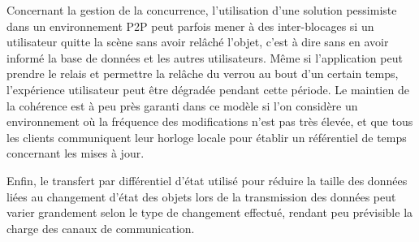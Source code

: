 Concernant la gestion de la concurrence, l'utilisation d'une solution pessimiste 
dans un environnement \gls{P2P} peut parfois mener à des inter-blocages si un 
utilisateur quitte la scène sans avoir relâché l'objet, c'est à dire sans en avoir 
informé la base de données et les autres 
utilisateurs. 
Même si l'application peut prendre le relais et permettre la relâche du 
verrou au bout d'un certain temps, l'expérience utilisateur peut être dégradée 
pendant cette période.
Le maintien de la cohérence est à peu près garanti dans ce modèle si l'on 
considère un environnement où la fréquence des modifications n'est pas très 
élevée, et que tous les clients communiquent leur horloge locale pour établir un 
référentiel de temps concernant les mises à jour. 

Enfin, le transfert par différentiel d'état utilisé pour réduire la taille des 
données liées au changement d'état des objets lors de la transmission des 
données peut varier grandement selon le type de changement 
effectué, rendant peu prévisible la charge des canaux de communication. 
%
